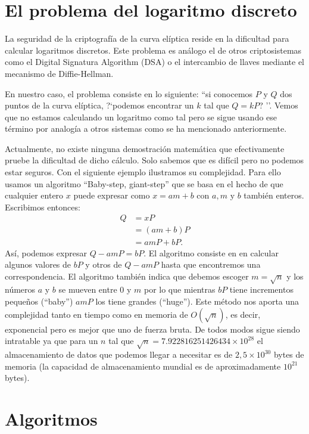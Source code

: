 \documentclass[11pt]{article}
\begin{document}
\section{El problema del logaritmo discreto}
La seguridad de la criptografía de la curva elíptica reside en la dificultad para calcular logaritmos discretos. Este problema es análogo el de otros criptosistemas como el Digital Signatura Algorithm (DSA) o el intercambio de llaves mediante el mecanismo de Diffie-Hellman.

En nuestro caso, el problema consiste en lo siguiente: ``si conocemos $ P $ y $ Q $ dos puntos de la curva elíptica, ?`podemos encontrar un $ k $ tal que $ Q = kP $? ''. Vemos que no estamos calculando un logaritmo como tal pero se sigue usando ese término por analogía a otros sistemas como se ha mencionado anteriormente. 

Actualmente, no existe ninguna demostración matemática que efectivamente pruebe la dificultad de dicho cálculo. Solo sabemos que es difícil pero no podemos estar seguros. Con el siguiente ejemplo ilustramos su complejidad. Para ello usamos un algoritmo ``Baby-step, giant-step'' que se basa en el hecho de que cualquier entero $ x $ puede expresar como $ x = am+b $ con $ a,m \text{ y } b$ también enteros. Escribimos entonces:
\begin{equation*}
\begin{split}
Q &= xP \\
  &= (am+b)P\\
  &=amP + bP.
\end{split}
\end{equation*}
Así, podemos expresar $ Q - amP  = bP $. El algoritmo consiste en en calcular algunos valores de $ bP $ y otros de $ Q-amP $ hasta que encontremos una correspondencia. El algoritmo también indica que debemos escoger $ m = \sqrt{n} $ y los números $ a $ y $ b $ se mueven entre 0 y $ m $ por lo que mientras $ bP $ tiene incrementos pequeños (``baby'') $ amP $ los tiene grandes (``huge''). Este método nos aporta una complejidad tanto en tiempo como en memoria de $ O(\sqrt{n}) $, es decir, exponencial pero es mejor que uno de fuerza bruta. De todos modos sigue siendo intratable ya que para un $  n  $ tal que $ \sqrt{n} = 7.922816251426434 \times 10^{28} $ el almacenamiento de datos que podemos llegar a necesitar es de $ 2,5\times10^{30} $ bytes de memoria (la capacidad de almacenamiento mundial es de aproximadamente $ 10^{21} $ bytes). \\

\section{Algoritmos}
\end{document}

